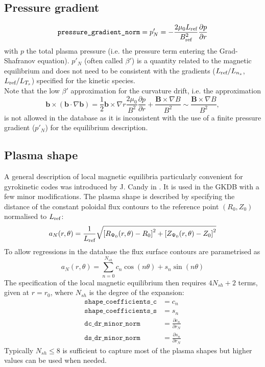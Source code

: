 \documentclass[a4paper]{report}
\begin{document}
\subsection{Pressure gradient} \label{sec:pressure:gradient}
$$\texttt{pressure\_gradient\_norm}=p'_N = -\frac{2\mu_0 L_{\textrm{ref}}}{B_{\textrm{ref}}^2 }\frac{\partial p}{\partial r}$$
with $p$ the total plasma pressure (i.e. the pressure term entering the Grad-Shafranov equation). $p'_N$ (often called $\beta'$) is a quantity related to the magnetic equilibrium and does not need to be consistent with the gradients ($L_{\textrm{ref}}/L_{n_s}$, $L_{\textrm{ref}}/L_{T_s}$) specified for the kinetic species.\\
Note that the low $\beta'$ approximation for the curvature drift, i.e. the approximation
$$\mathbf{b}\times(\mathbf{b}\cdot\nabla\mathbf{b})=\frac{1}{2}\mathbf{b}\times\nabla r\frac{2\mu_0}{B^2}\frac{\partial p}{\partial r} + \frac{\mathbf{B}\times\nabla B}{B^2} \sim  \frac{\mathbf{B}\times\nabla B}{B^2}, $$
is not allowed in the database as it is inconsistent with the use of a finite pressure gradient ($p'_N$) for the equilibrium description. 


\subsection{Plasma shape} \label{sec:shape:coefficients}
A general description of local magnetic equilibria particularly convenient for gyrokinetic codes was introduced by J. Candy in \cite {Candy:PPCF2009}. It is used in the GKDB with a few minor modifications.
The plasma shape is described by specifying the distance of the constant poloidal flux contours to the reference point $(R_0,Z_0)$  normalised to $L_{\textrm{ref}}$:
$$ a_N(r,\theta) = \frac{1}{L_{\textrm{ref}}}\sqrt{\left[R_{\Psi_0}(r,\theta)-R_0\right]^2 + \left[Z_{\Psi_0}(r,\theta)-Z_0\right]^2} $$
To allow regressions in the database the flux surface contours are parametrised as 
$$ a_N(r,\theta) = \sum_{n=0}^{N_{sh}} c_n \cos(n\theta) + s_n \sin(n\theta) $$
The specification of the local magnetic equilibrium then requires $4N_{sh}+2$ terms, given at $r=r_0$, where $N_{sh}$ is the degree of the expansion: 
\begin{align*}
\texttt{shape\_coefficients\_c} & = c_n \\
\texttt{shape\_coefficients\_s} & = s_n \\
\texttt{dc\_dr\_minor\_norm} & = \frac{\partial c_n}{\partial r_N} \\
\texttt{ds\_dr\_minor\_norm} & = \frac{\partial s_n}{\partial r_N} 
\end{align*}
Typically $N_{sh}\leq8$ is sufficient to capture most of the plasma shapes but higher values can be used when needed.
\end{document}
